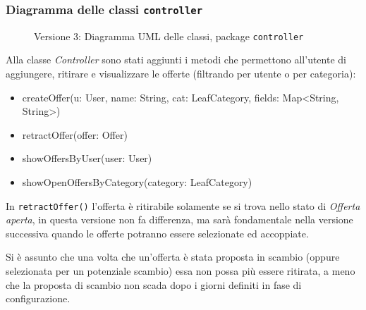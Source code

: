 \subsubsection{Diagramma delle classi \texttt{controller}}
\vspace{0.5cm}
\begin{figure}[H]
    \centering
    \caption{Versione 3: Diagramma UML delle classi, package \texttt{controller}}
    \label{fig:class_controller_v_3}
\end{figure}

Alla classe \textit{Controller} sono stati aggiunti i metodi che permettono all'utente di aggiungere, ritirare e visualizzare le offerte (filtrando per utente o per categoria):
\begin{itemize}
    \item createOffer(u: User, name: String, cat: LeafCategory, fields: Map<String, String>)
    \item retractOffer(offer: Offer)
    \item showOffersByUser(user: User)
    \item showOpenOffersByCategory(category: LeafCategory)
\end{itemize}

In \texttt{retractOffer()} l'offerta è ritirabile solamente se si trova nello stato di \textit{Offerta aperta},
in questa versione non fa differenza, ma sarà fondamentale nella versione successiva quando le offerte potranno essere
selezionate ed accoppiate.

Si è assunto che una volta che un'offerta è stata proposta in scambio (oppure selezionata per un potenziale scambio)
essa non possa più essere ritirata, a meno che la proposta di scambio non scada dopo i giorni definiti in fase di configurazione.